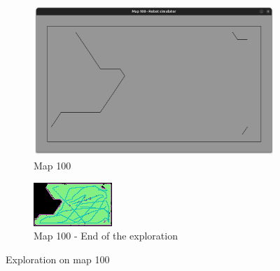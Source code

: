 \documentclass[../main.tex]{subfiles}
\begin{document}
\begin{figure}[H]
	\centering
	\begin{subfigure}{0.45\textwidth}
		\centering
		\includegraphics[width=\textwidth]{IMAGES/part5/map100.png}
		\caption{Map 100}
	\end{subfigure}
	\hfill
	\begin{subfigure}{0.45\textwidth}
		\centering
		\includegraphics[width=\textwidth]{IMAGES/part5/map100_explored_5robot.png}
		\caption{Map 100 - End of the exploration}
	\end{subfigure}
	\caption{Exploration on map 100}
	\label{fig:explo_100}
\end{figure}
\end{document}
